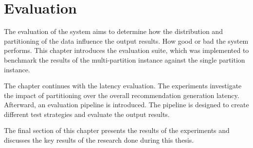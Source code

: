 \chapter{Evaluation}
\label{chap:evaluation}
The evaluation of the system aims to determine how the distribution and partitioning of the data influence the output results. How good or bad the system performs. This chapter introduces the evaluation suite, which was implemented to benchmark the results of the multi-partition instance against the single partition instance.

The chapter continues with the latency evaluation. The experiments investigate the impact of partitioning over the overall recommendation generation latency. Afterward, an evaluation pipeline is introduced. The pipeline is designed to create different test strategies and evaluate the output results.

The final section of this chapter presents the results of the experiments and discusses the key results of the research done during this thesis.
